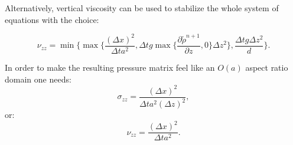 Alternatively, vertical viscosity can be used to stabilize the 
whole system of equations with the choice:


\begin{equation}
\nu_{zz}=\min\{\max\{\frac{(\Delta x)^2}{\Delta t a^2}, 
\Delta t g \max\{\frac{\partial \tilde \rho^{n+1}}{\partial z}, 0\} 
 \Delta z^2 \}, 
\frac{\Delta t g \Delta z^2}{d} \}. 
\label{nu}     
\end{equation}

In order to make the resulting pressure matrix feel like an $O(a)$ 
aspect ratio domain one needs:
\begin{equation}
\sigma_{zz}= \frac{(\Delta x)^2}{\Delta t a^2 (\Delta z)^2}, 
\label{sigma_z_for_order_one}
\end{equation}
or:
\begin{equation}
\nu_{zz}= \frac{(\Delta x)^2}{\Delta t a^2 }. 
\label{nu_z_for_order_one}
\end{equation}




